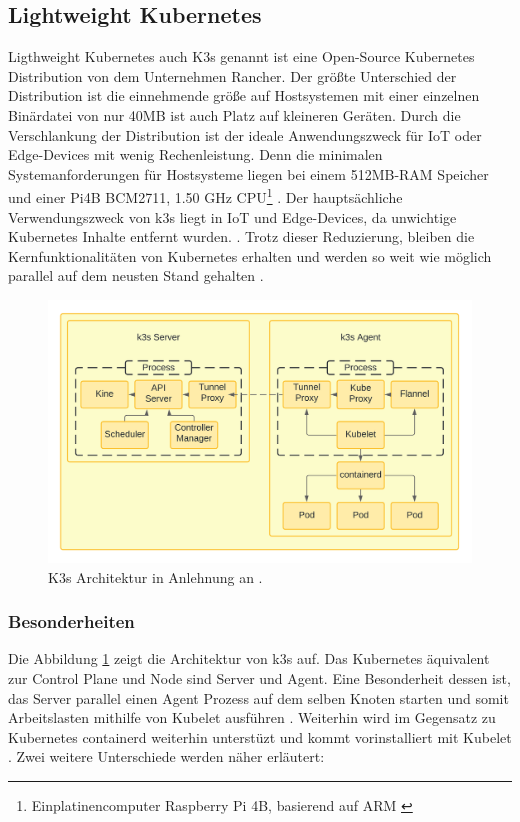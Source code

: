 \subsection{Lightweight Kubernetes} \label{k3s}
Ligthweight Kubernetes auch K3s genannt ist eine Open-Source Kubernetes Distribution von dem Unternehmen
Rancher. Der größte Unterschied der Distribution ist die einnehmende größe 
auf Hostsystemen mit einer einzelnen Binärdatei von nur 40MB ist auch Platz auf kleineren Geräten.
Durch die Verschlankung der Distribution ist der ideale Anwendungszweck für IoT oder Edge-Devices mit wenig Rechenleistung.
Denn die minimalen Systemanforderungen für Hostsysteme liegen bei einem 512MB-RAM Speicher und einer Pi4B BCM2711, 1.50 GHz CPU\footnote{Einplatinencomputer Raspberry Pi 4B, basierend auf ARM \cite{pi4} } \cite{k3sAnforderung}.
Der hauptsächliche Verwendungszweck von k3s liegt in IoT und Edge-Devices, da unwichtige Kubernetes Inhalte entfernt wurden. \cite{k3s}.
Trotz dieser Reduzierung, bleiben die Kernfunktionalitäten von Kubernetes erhalten und werden 
so weit wie möglich parallel auf dem neusten Stand gehalten \cite{k3sgit}.

\begin{figure}
  \centering
  \includegraphics[width=1.0\columnwidth]{images/K3sArchitektur.png}
  \caption{K3s Architektur in Anlehnung an \cite{k3sarch}.}
  \label{fig:k3sarchitektur}
\end{figure}

\subsubsection{Besonderheiten}
Die Abbildung \ref{fig:k3sarchitektur} zeigt die Architektur von k3s auf. Das Kubernetes äquivalent zur Control Plane und Node
sind Server und Agent. Eine Besonderheit dessen ist, das Server parallel einen Agent Prozess auf dem selben Knoten starten und
somit Arbeitslasten mithilfe von Kubelet ausführen \cite{k3sServerAgent}. Weiterhin wird im Gegensatz zu Kubernetes containerd weiterhin unterstüzt und
kommt vorinstalliert mit Kubelet \cite{k3s}. Zwei weitere Unterschiede werden näher erläutert:

